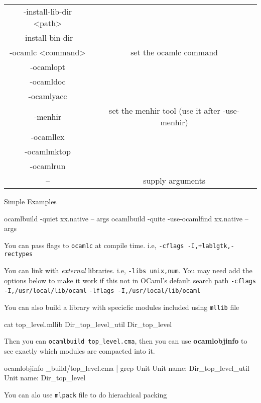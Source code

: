 \begin{spacing}{0.5}
\begin{tabular}{|c|c|}
-install-lib-dir <path> & \\
-install-bin-dir & \\
-ocamlc <command> & set the ocamlc command \\
-ocamlopt  & \\
-ocamldoc & \\
-ocamlyacc & \\
-menhir & set the menhir tool (use it after -use-menhir)\\
-ocamllex & \\
-ocamlmktop & \\
-ocamlrun & \\
--  & supply arguments \\
\hline
  \end{tabular}
\end{spacing}


Simple Examples

\begin{bluetext}
ocamlbuild -quiet xx.native -- args
ocamlbuild -quite -use-ocamlfind xx.native -- args
\end{bluetext}


You can pass flags to \verb|ocamlc| at compile time. i.e,
\verb|-cflags -I,+lablgtk,-rectypes|

You can link with \textit{ external} libraries. i.e,
\verb|-libs unix,num|.  You may need add the options below to make it
work if this not in OCaml's default search path
\verb|-cflags -I,/usr/local/lib/ocaml|
\verb|-lflags -I,/usr/local/lib/ocaml|


You can also build a library with specicfic modules included using
\verb|mllib| file

\begin{bluetext}
cat top_level.mllib    
Dir_top_level_util
Dir_top_level  
\end{bluetext}

Then you can \verb|ocamlbuild top_level.cma|, then you can use
\textbf{ocamlobjinfo} to see exactly which modules are compacted into
it.

\begin{bluetext}
ocamlobjinfo _build/top_level.cma | grep Unit  
Unit name: Dir_top_level_util
Unit name: Dir_top_level
\end{bluetext}

You can alo use  \verb|mlpack| file to do hierachical packing 

